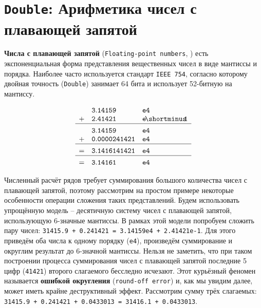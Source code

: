 \documentclass{article}
\theoremstyle{definition}
\begin{document}
\section{\lstinline|Double|: Арифметика чисел с плавающей запятой}
\lstset{style=mystyle}
\textbf{Числа с плавающей запятой} (\verb_Floating-point numbers_, \cite{Float}) есть экспоненциальная форма представления вещественных чисел в виде мантиссы и порядка. Наиболее часто используется стандарт \verb_IEEE 754_, согласно которому двойная точность (\verb_Double_) занимает 64 бита и использует 52-битную на мантиссу.\\[-10pt]
\begin{wrapfigure}{l}{0.3\textwidth} \vspace{-12pt}
\begin{equation*}
\begin{array}{l l l}
& \mathtt{3.14159} & \mathtt{e4} \\
\mathtt{+} & \mathtt{2.41421} & \mathtt{e\!\shortminus\!\!1} \\ \hline \\[-8pt]
& \mathtt{3.14159} & \mathtt{e4} \\
\mathtt{+} & \mathtt{0.0000241421} & \mathtt{e4} \\ \hline  \\[-8pt]
\mathtt{=} & \mathtt{3.1416141421} & \mathtt{e4} \\ \hline \\[-8pt]
\mathtt{=} & \mathtt{3.14161} & \mathtt{e4}
\end{array}
\end{equation*}
\end{wrapfigure} \indent
Численный расчёт рядов требует суммирования большого количества чисел с плавающей запятой, поэтому рассмотрим на простом примере некоторые особенности операции сложения таких представлений. Будем использовать упрощённую модель -- десятичную систему чисел с плавающей запятой, использующую 6-значные мантиссы. В рамках этой модели попробуем сложить пару чисел: \verb_31415.9 + 0.241421 = 3.14159e4 + 2.41421e-1_. Для этого приведём оба числа к одному порядку (\verb_e4_), произведём суммирование и округлим результат до 6-значной мантиссы. Нельзя не заметить, что при таком построении процесса суммирования чисел с плавающей запятой последние 5 цифр (\verb_41421_) второго слагаемого бесследно исчезают.  Этот курьёзный феномен называется \textbf{ошибкой округления} (\verb_round-off error_) и, как мы увидим далее, может иметь крайне деструктивный эффект. \newpage\noindent
Рассмотрим сумму трёх слагаемых: \verb_31415.9 + 0.241421 + 0.0433013 = 31416.1 + 0.0433013_. 
\end{document}
